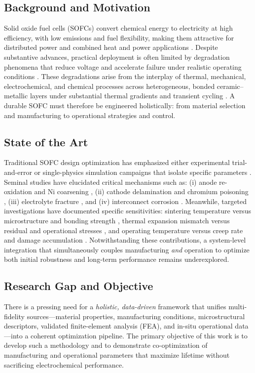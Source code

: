 \documentclass[conference]{IEEEtran}
\begin{document}
\subsection{Background and Motivation}
Solid oxide fuel cells (SOFCs) convert chemical energy to electricity at high efficiency, with low emissions and fuel flexibility, making them attractive for distributed power and combined heat and power applications \cite{R1,R2}. Despite substantive advances, practical deployment is often limited by degradation phenomena that reduce voltage and accelerate failure under realistic operating conditions \cite{R3,R4}. These degradations arise from the interplay of thermal, mechanical, electrochemical, and chemical processes across heterogeneous, bonded ceramic–metallic layers under substantial thermal gradients and transient cycling \cite{R5}. A durable SOFC must therefore be engineered holistically: from material selection and manufacturing to operational strategies and control.

\subsection{State of the Art}
Traditional SOFC design optimization has emphasized either experimental trial-and-error or single-physics simulation campaigns that isolate specific parameters \cite{R6,R7}. Seminal studies have elucidated critical mechanisms such as: (i) anode re-oxidation and Ni coarsening \cite{R8}, (ii) cathode delamination and chromium poisoning \cite{R9}, (iii) electrolyte fracture \cite{R10}, and (iv) interconnect corrosion \cite{R11}. Meanwhile, targeted investigations have documented specific sensitivities: sintering temperature versus microstructure and bonding strength \cite{R12}, thermal expansion mismatch versus residual and operational stresses \cite{R13}, and operating temperature versus creep rate and damage accumulation \cite{R14}. Notwithstanding these contributions, a system-level integration that simultaneously couples manufacturing \emph{and} operation to optimize both initial robustness and long-term performance remains underexplored.

\subsection{Research Gap and Objective}
There is a pressing need for a \emph{holistic, data-driven} framework that unifies multi-fidelity sources—material properties, manufacturing conditions, microstructural descriptors, validated finite-element analysis (FEA), and in-situ operational data—into a coherent optimization pipeline. The primary objective of this work is to develop such a methodology and to demonstrate co-optimization of manufacturing and operational parameters that maximize lifetime without sacrificing electrochemical performance.
\end{document}

